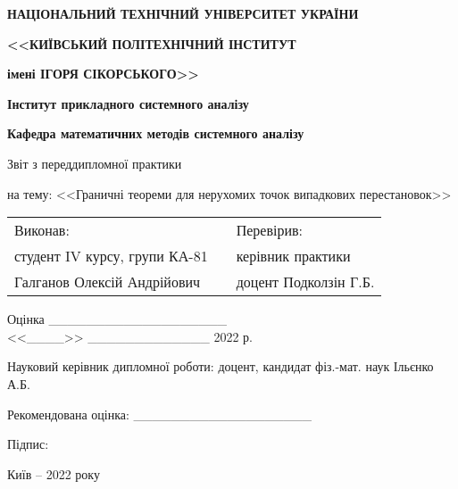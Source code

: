 \thispagestyle{empty}
\begin{center}
    {
        \textbf{НАЦІОНАЛЬНИЙ ТЕХНІЧНИЙ УНІВЕРСИТЕТ УКРАЇНИ}

        \textbf{<<КИЇВСЬКИЙ ПОЛІТЕХНІЧНИЙ ІНСТИТУТ}
        
        \textbf{імені ІГОРЯ СІКОРСЬКОГО>>}
        
        \textbf{Інститут прикладного системного аналізу}
        
        \textbf{Кафедра математичних методів системного аналізу}

    }
\end{center}

\begin{center}
    Звіт з переддипломної практики

    на тему: <<Граничні теореми для нерухомих точок випадкових перестановок>>
\end{center}
\vspace{15mm}

\begin{flushleft}
    \begin{tabular}{lp{4cm}l}
        Виконав: & & Перевірив:\\
        студент IV курсу, групи КА-81 & & керівник практики\\
        Галганов Олексій Андрійович & & доцент Подколзін Г.Б.
    \end{tabular}
\end{flushleft}
\vspace{5mm}

\begin{flushright}
    Оцінка \_\_\_\_\_\_\_\_\_\_\_\_\_\_\_\_\_\_\_ \\
    <<\_\_\_\_>> \_\_\_\_\_\_\_\_\_\_\_\_\_ 2022 р.
\end{flushright}

\vspace{20mm}
\noindent Науковий керівник дипломної роботи: доцент, кандидат фіз.-мат. наук Ільєнко А.Б.

\noindent Рекомендована оцінка: \_\_\_\_\_\_\_\_\_\_\_\_\_\_\_\_\_\_\_

\vspace{10mm}
\noindent Підпис:

\vfill
\begin{center}
    Київ -- 2022 року
\end{center}
\newpage